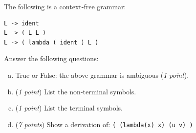 \documentclass[11pt]{article} %
\begin{document}
\begin{enumerate}
The following is a context-free grammar:
\begin{verbatim}
L -> ident
L -> ( L L )
L -> ( lambda ( ident ) L )
\end{verbatim}

Answer the following questions:
\begin{enumerate}[a.]
\item True or False: the above grammar is ambiguous (\emph{1 point}).

\item  (\emph{1 point}) List the non-terminal symbols.

\item  (\emph{1 point}) List the terminal symbols.

\item (\emph{7 points}) Show a derivation of: \verb+( (lambda(x) x) (u v) )+
\end{enumerate}
\vfill


\end{enumerate}
\end{document}
